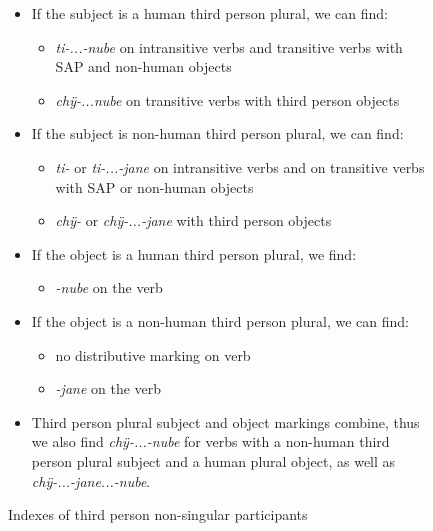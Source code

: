 \begin{figure}
%
 \begin{itemize}
\item If the subject is a human third person plural, we can find:
 \begin{itemize}
\item \textit{ti-...-nube} on intransitive verbs and transitive verbs with SAP and non-human objects
\item \textit{chÿ-...nube} on transitive verbs with third person objects
\end{itemize}

\item If the subject is non-human third person plural, we can find:
 \begin{itemize}
\item \textit{ti-} or \textit{ti-...-jane} on intransitive verbs and on transitive verbs with SAP or non-human objects
\item \textit{chÿ-} or \textit{chÿ-...-jane} with third person objects
\end{itemize}

\item If the object is a human third person plural, we find:
 \begin{itemize}
\item \textit{-nube} on the verb
\end{itemize}

\item If the object is a non-human third person plural, we can find:
 \begin{itemize}
\item no distributive marking on verb
\item \textit{-jane} on the verb
\end{itemize}

\item Third person plural subject and object markings combine, thus we also find \textit{chÿ-...-nube} for verbs with a non-human third person plural subject and a human plural object, as well as \textit{chÿ-...-jane...-nube}.
\end{itemize}

\caption{Indexes of third person non-singular participants}
\label{fig:3PL}
%
\end{figure}



